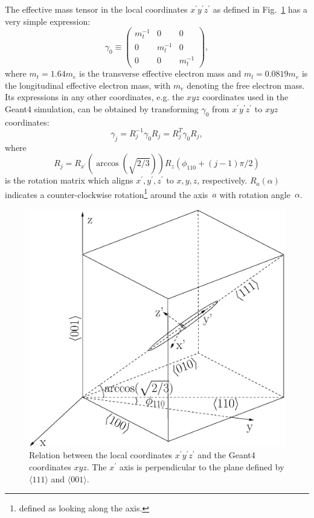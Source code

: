 \documentclass[epj]{svjour}
\begin{document}
The effective mass tensor in the local coordinates $x^{\prime}
y^{\prime} z^{\prime}$ as defined in Fig.~\ref{f:axes} has a very
simple expression:
\begin{equation} 
\label{e:g0} 
\gamma_{0} \equiv \left( 
\begin{array}{ccc} 
m_{t}^{-1} & 0 & 0 \\ 
0 & m_{l}^{-1} & 0 \\ 
0 & 0 & m_{t}^{-1} 
\end{array} \right), 
\end{equation} 
where $m_{t} = 1.64m_{e}$ is the transverse effective electron mass
and $m_{l} = 0.0819m_{e}$ is the longitudinal effective electron mass,
with $m_{e}$ denoting the free electron mass. Its expressions in any
other coordinates, e.g. the $xyz$ coordinates used in the Geant4
simulation, can be obtained by transforming $\gamma_{0}$ from
$x^{\prime} y^{\prime} z^{\prime}$ to $xyz$ coordinates:
\begin{equation} 
\label{e:gs} 
\gamma_{j} = R_{j}^{-1}\gamma_{0}R_{j} = R_{j}^{T}\gamma_{0}R_{j}, 
\end{equation} 
where 
\begin{equation} 
\label{e:rs} 
R_{j} = R_{x^{\prime}}(\arccos(\sqrt{2/3}))R_{z}(\phi_{110}+(j-1)\pi/2) 
\end{equation} 
is the rotation matrix which aligns $x^{\prime}, y^{\prime},
z^{\prime}$ to $x,y,z$, respectively. $R_a(\alpha)$ indicates a
counter-clockwise rotation\footnote{defined as looking along the
axis.} around the axis~$a$ with rotation angle~$\alpha$.
 
\begin{figure}[htpb]
\centering
\includegraphics[width=0.7\linewidth]{axes}   
\caption{Relation between the local coordinates $x^{\prime} y^{\prime}
z^{\prime}$ and the Geant4 coordinates $xyz$. The $x^{\prime}$ axis is
perpendicular to the plane defined by $\langle111\rangle$ and $\langle
001 \rangle$.}
\label{f:axes} 
\end{figure} 
\end{document}
